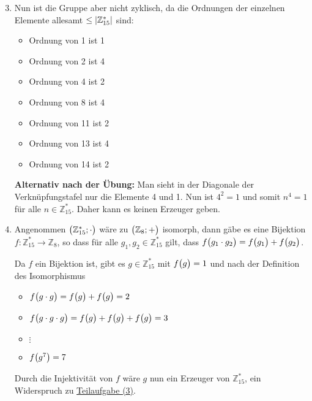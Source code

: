 \documentclass{scrreprt}
\begin{document}
\begin{enumerate}[(a)]
  \begin{enumerate}[(1)]
  \setcounter{enumii}{2}
  \item \label{7_2_a_3} Nun ist die Gruppe aber nicht zyklisch, da die Ordnungen
    der einzelnen Elemente allesamt $\leq \abs{\mathbb{Z}_{15}^*}$ sind:
    \begin{itemize}
    \item Ordnung von 1 ist 1
    \item Ordnung von 2 ist 4
    \item Ordnung von 4 ist 2
    \item Ordnung von 8 ist 4
    \item Ordnung von 11 ist 2
    \item Ordnung von 13 ist 4
    \item Ordnung von 14 ist 2
    \end{itemize}

    \textbf{Alternativ nach der Übung:} Man sieht in der Diagonale der
    Verknüpfungstafel nur die Elemente 4 und 1.
    Nun ist $4^2 = 1$ und somit $n^4 = 1$ für alle $n \in \mathbb{Z}_{15}^*$.
    Daher kann es keinen Erzeuger geben.

  \item Angenommen $\qty\big(\mathbb{Z}_{15}^*; \cdot)$ wäre zu
    $\qty\big(\mathbb{Z}_8; +)$ isomorph, dann gäbe es eine Bijektion
    $f \colon \mathbb{Z}_{15}^* \to \mathbb{Z}_8$, so dass für alle
    $g_1, g_2 \in \mathbb{Z}_{15}^*$ gilt, dass
    $f\qty\big(g_1 \cdot g_2) = f\qty\big(g_1) + f\qty\big(g_2)$.

    Da $f$ ein Bijektion ist, gibt es $g \in \mathbb{Z}_{15}^*$ mit
    $f\qty\big(g) = 1$ und nach der Definition des Isomorphismus
    \begin{itemize}
    \item $f\qty\big(g \cdot g) = f\qty\big(g) + f\qty\big(g) = 2$
    \item $f\qty\big(g \cdot g \cdot g) = f\qty\big(g) + f\qty\big(g) + f\qty\big(g)= 3$
    \item $\vdots$
    \item $f\qty\big(g^7) = 7$
    \end{itemize}
    Durch die Injektivität von $f$ wäre $g$ nun ein Erzeuger von
    $\mathbb{Z}_{15}^*$, ein Widerspruch zu \hyperref[7_2_a_3]{Teilaufgabe (3)}.


\end{enumerate}
\end{enumerate}
\end{document}
